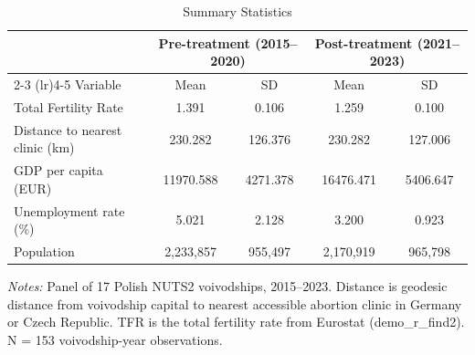 \begin{table}[H]
\centering
\caption{Summary Statistics}
\begin{threeparttable}
\begin{tabular}{lcccc}
\toprule
 & \multicolumn{2}{c}{Pre-treatment (2015--2020)} & \multicolumn{2}{c}{Post-treatment (2021--2023)} \\
\cmidrule(lr){2-3} \cmidrule(lr){4-5}
Variable & Mean & SD & Mean & SD \\
\midrule
Total Fertility Rate & 1.391 & 0.106 & 1.259 & 0.100 \\
Distance to nearest clinic (km) & 230.282 & 126.376 & 230.282 & 127.006 \\
GDP per capita (EUR) & 11970.588 & 4271.378 & 16476.471 & 5406.647 \\
Unemployment rate (\%) & 5.021 & 2.128 & 3.200 & 0.923 \\
Population & 2,233,857 & 955,497 & 2,170,919 & 965,798 \\
\bottomrule
\end{tabular}
\begin{tablenotes}[flushleft]
\small
\item \textit{Notes:} Panel of 17 Polish NUTS2 voivodships, 2015--2023. Distance is geodesic distance from voivodship capital to nearest accessible abortion clinic in Germany or Czech Republic. TFR is the total fertility rate from Eurostat (demo\_r\_find2). N = 153 voivodship-year observations.
\end{tablenotes}
\end{threeparttable}
\label{tab:summary}
\end{table}

